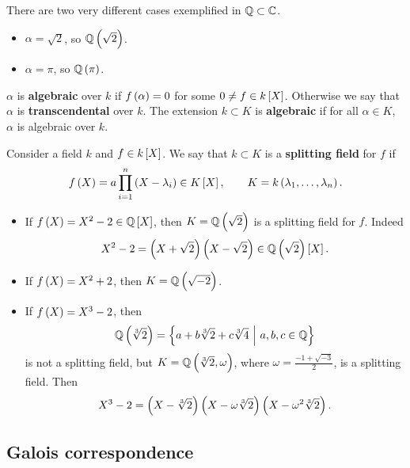 \begin{example*}
There are two very different cases exemplified in $ \mathbb{Q} \subset \mathbb{C} $.
\begin{itemize}
\item $ \alpha = \sqrt{2} $, so $ \QQ\br{\sqrt{2}} $.
\item $ \alpha = \pi $, so $ \QQ\br{\pi} $.
\end{itemize}
\end{example*}

\begin{definition}
$ \alpha $ is \textbf{algebraic} over $ k $ if $ f\br{\alpha} = 0 $ for some $ 0 \ne f \in k\sbr{X} $. Otherwise we say that $ \alpha $ is \textbf{transcendental} over $ k $. The extension $ k \subset K $ is \textbf{algebraic} if for all $ \alpha \in K $, $ \alpha $ is algebraic over $ k $.
\end{definition}

\begin{definition}
Consider a field $ k $ and $ f \in k\sbr{X} $. We say that $ k \subset K $ is a \textbf{splitting field} for $ f $ if
$$ f\br{X} = a\prod_{i = 1}^n \br{X - \lambda_i} \in K\sbr{X}, \qquad K = k\br{\lambda_1, \dots, \lambda_n}. $$
\end{definition}

\begin{example*}
\hfill
\begin{itemize}
\item If $ f\br{X} = X^2 - 2 \in \QQ\sbr{X} $, then $ K = \QQ\br{\sqrt{2}} $ is a splitting field for $ f $. Indeed
$$ X^2 - 2 =\br{X + \sqrt{2}}\br{X - \sqrt{2}} \in \QQ\br{\sqrt{2}}\sbr{X}. $$
\item If $ f\br{X} = X^2 + 2 $, then $ K = \QQ\br{\sqrt{-2}} $.
\item If $ f\br{X} = X^3 - 2 $, then
$$ \QQ\br{\sqrt[3]{2}} = \cbr{a + b\sqrt[3]{2} + c\sqrt[3]{4} \st a, b, c \in \QQ} $$
is not a splitting field, but $ K = \QQ\br{\sqrt[3]{2}, \omega} $, where $ \omega = \tfrac{-1 + \sqrt{-3}}{2} $, is a splitting field. Then
$$ X^3 - 2 = \br{X - \sqrt[3]{2}}\br{X - \omega\sqrt[3]{2}}\br{X - \omega^2\sqrt[3]{2}}. $$
\end{itemize}
\end{example*}

\subsection{Galois correspondence}

